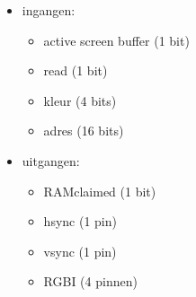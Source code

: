 \begin {itemize}
\item ingangen:
\begin {itemize}
\item active screen buffer (1 bit)
\item read (1 bit)
\item kleur (4 bits)
\item adres (16 bits)
\end {itemize}
\item uitgangen:
\begin {itemize}
\item RAMclaimed (1 bit)
\item hsync (1 pin)
\item vsync (1 pin)
\item RGBI (4 pinnen)
\end {itemize}
\end {itemize}
